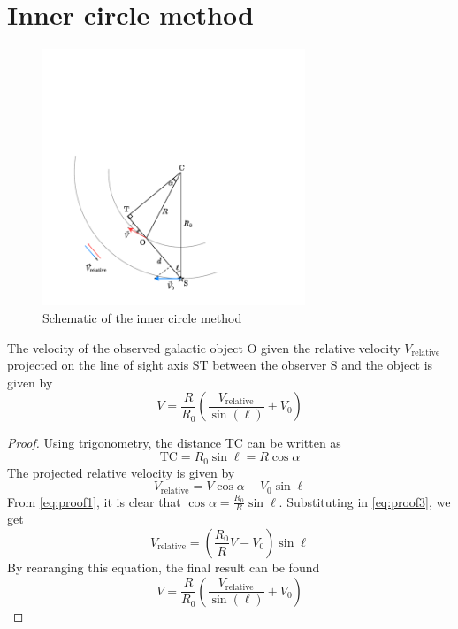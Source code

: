 \section{Inner circle method}
\label{sec:proof_inner_circle}

\begin{figure}[htbp]
    \centering
    \includegraphics[width=0.7\textwidth]{figures/inner_circle_method.pdf}
    \caption{Schematic of the inner circle method}
    \label{fig:inner_circle_method}
\end{figure}

The velocity of the observed galactic object O given the relative velocity $V_\textrm{relative}$ projected on the line of sight axis ST between the observer S and the object is given by
\begin{equation}
    V = \frac{R}{R_0} \left( \frac{V_\textrm{relative}}{\sin(\ell)} + V_0 \right)
\end{equation}

\begin{proof}
    Using trigonometry, the distance TC can be written as
    \begin{equation}
       \textrm{TC} = R_0 \sin\ell = R \cos\alpha
       \label{eq:proof1}
    \end{equation}
    The projected relative velocity is given by
    \begin{equation}
        V_\textrm{relative} = V \cos\alpha - V_0 \sin\ell
       \label{eq:proof3}
    \end{equation}
    From \autoref{eq:proof1}, it is clear that $\cos\alpha = \frac{R_0}{R} \sin\ell$. Substituting in \autoref{eq:proof3}, we get
    \begin{equation}
        V_\textrm{relative} = \left( \frac{R_0}{R} V - V_0 \right) \sin\ell
    \end{equation}
    By rearanging this equation, the final result can be found
    \begin{equation}
        V = \frac{R}{R_0} \left( \frac{V_\textrm{relative}}{\sin(\ell)} + V_0 \right)
    \end{equation}
\end{proof}
